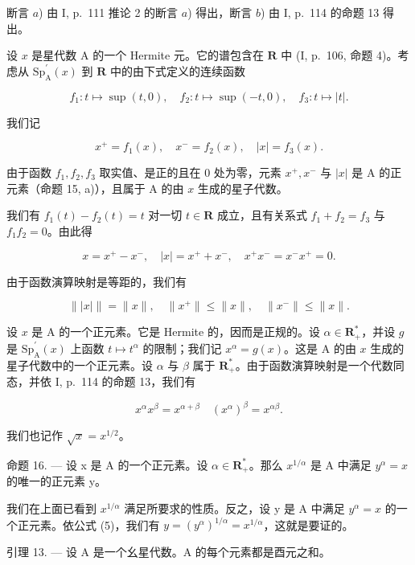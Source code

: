 断言 \(a\)) 由 I, p.~111 推论 2 的断言 \(a\)) 得出，断言 \(b\)) 由 I, p.~114 的命题 13 得出。

设 \(x\) 是星代数 A 的一个 Hermite 元。它的谱包含在 \(\mathbf{R}\) 中 (I, p.~106, 命题 4)。考虑从 \(\mathrm{Sp}_{\mathrm{A}}^{\prime}(x)\) 到 \(\mathbf{R}\) 中的由下式定义的连续函数

\[
f _ {1} \colon t \mapsto \sup (t, 0), \quad f _ {2} \colon t \mapsto \sup (- t, 0), \quad f _ {3} \colon t \mapsto | t |.
\]

我们记

\[
x ^ {+} = f _ {1} (x), \quad x ^ {-} = f _ {2} (x), \quad | x | = f _ {3} (x).\tag{3}
\]

由于函数 \(f_1, f_2, f_3\) 取实值、是正的且在 0 处为零，元素 \(x^+, x^-\) 与 \(|x|\) 是 A 的正元素（命题 15, a)），且属于 A 的由 \(x\) 生成的星子代数。

我们有 \(f_{1}(t) - f_{2}(t) = t\) 对一切 \(t \in \mathbf{R}\) 成立，且有关系式 \(f_{1} + f_{2} = f_{3}\) 与 \(f_{1}f_{2} = 0\)。由此得

\[
x = x ^ {+} - x ^ {-}, \quad | x | = x ^ {+} + x ^ {-}, \quad x ^ {+} x ^ {-} = x ^ {-} x ^ {+} = 0.\tag{4}
\]

由于函数演算映射是等距的，我们有

\[
\| | x | \| = \| x \|, \quad \| x ^ {+} \| \leqslant \| x \|, \quad \| x ^ {-} \| \leqslant \| x \|.
\]

设 \(x\) 是 A 的一个正元素。它是 Hermite 的，因而是正规的。设 \(\alpha \in \mathbf{R}_{+}^{*}\)，并设 \(g\) 是 \(\mathrm{Sp}_{\mathrm{A}}^{\prime}(x)\) 上函数 \(t \mapsto t^{\alpha}\) 的限制；我们记 \(x^{\alpha} = g(x)\)。这是 A 的由 \(x\) 生成的星子代数中的一个正元素。设 \(\alpha\) 与 \(\beta\) 属于 \(\mathbf{R}_{+}^{*}\)。由于函数演算映射是一个代数同态，并依 I, p.~114 的命题 13，我们有

\[
x ^ {\alpha} x ^ {\beta} = x ^ {\alpha + \beta} \quad (x ^ {\alpha}) ^ {\beta} = x ^ {\alpha \beta}.\tag{5}
\]

我们也记作 \(\sqrt{x} = x^{1/2}\)。

命题 16. — 设 x 是 A 的一个正元素。设 \(\alpha \in \mathbf{R}_{+}^{*}\)。那么 \(x^{1/\alpha}\) 是 A 中满足 \(y^{\alpha} = x\) 的唯一的正元素 y。

我们在上面已看到 \(x^{1/\alpha}\) 满足所要求的性质。反之，设 y 是 A 中满足 \(y^{\alpha} = x\) 的一个正元素。依公式 (5)，我们有 \(y = (y^{\alpha})^{1/\alpha} = x^{1/\alpha}\)，这就是要证的。

引理 13. — 设 A 是一个幺星代数。A 的每个元素都是酉元之和。


